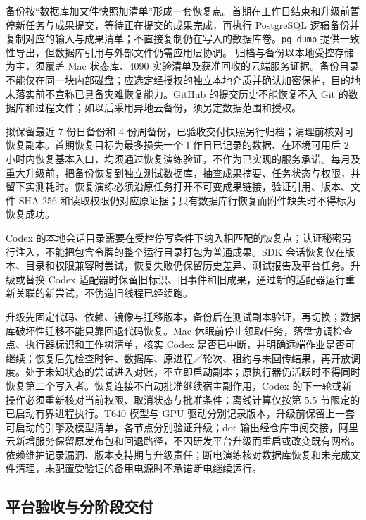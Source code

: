 \documentclass[11pt,a4paper]{article}
\begin{document}
备份按“数据库加文件快照加清单”形成一套恢复点。首期在工作日结束和升级前暂停新任务与成果提交，等待正在提交的成果完成，再执行 PostgreSQL 逻辑备份并复制对应的输入与成果清单；不直接复制仍在写入的数据库卷。\texttt{pg\_dump} 提供一致性导出，但数据库引用与外部文件仍需应用层协调。\cite{ops-postgres-backup} 归档与备份以本地受控存储为主，须覆盖 Mac 状态库、4090 实验清单及获准回收的云端服务证据。备份目录不能仅在同一块内部磁盘；应选定经授权的独立本地介质并确认加密保护，目的地未落实前不宣称已具备灾难恢复能力。GitHub 的提交历史不能恢复不入 Git 的数据库和过程文件；如以后采用异地云备份，须另定数据范围和授权。

拟保留最近 7 份日备份和 4 份周备份，已验收交付快照另行归档；清理前核对可恢复副本。首期恢复目标为最多损失一个工作日已记录的数据、在环境可用后 2 小时内恢复基本入口，均须通过恢复演练验证，不作为已实现的服务承诺。每月及重大升级前，把备份恢复到独立测试数据库，抽查成果摘要、任务状态与权限，并留下实测耗时。恢复演练必须沿原任务打开不可变成果链接，验证引用、版本、文件 SHA-256 和读取权限仍对应原证据；只有数据库行恢复而附件缺失时不得标为恢复成功。

Codex 的本地会话目录需要在受控停写条件下纳入相匹配的恢复点；认证秘密另行注入，不能把包含令牌的整个运行目录打包为普通成果。SDK 会话恢复仅在版本、目录和权限兼容时尝试，恢复失败仍保留历史差异、测试报告及平台任务。升级或替换 Codex 适配器时保留旧标识、旧事件和旧成果，通过新的适配器运行重新关联的新尝试，不伪造旧线程已经续跑。

升级先固定代码、依赖、镜像与迁移版本，备份后在测试副本验证，再切换；数据库破坏性迁移不能只靠回退代码恢复。Mac 休眠前停止领取任务，落盘协调检查点、执行器标识和工作树清单，核实 Codex 是否已中断，并明确远端作业是否可继续；恢复后先检查时钟、数据库、原进程／轮次、租约与未回传结果，再开放调度。处于未知状态的尝试进入对账，不立即启动副本；原执行器仍活跃时不得同时恢复第二个写入者。恢复连接不自动批准继续宿主副作用，Codex 的下一轮或新操作必须重新核对当前权限、取消状态与批准条件；离线计算仅按第 5.5 节限定的已启动有界进程执行。T640 模型与 GPU 驱动分别记录版本，升级前保留上一套可启动的引擎及模型清单，各节点分别验证升级；dot 输出经仓库审阅交接，阿里云新增服务保留原发布包和回退路径，不因研发平台升级而重启或改变既有网格。依赖维护记录漏洞、版本支持期与升级责任；断电演练核对数据库恢复和未完成文件清理，未配置受验证的备用电源时不承诺断电继续运行。

\subsection{平台验收与分阶段交付}
\label{sec:impl-acceptance}
\end{document}

